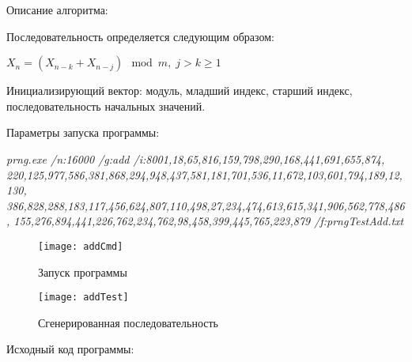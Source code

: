 \documentclass[bachelor, och, coursework]{shiza}
\begin{document}
	Описание алгоритма:
	
	Последовательность определяется следующим образом:
	\begin{center}
		$X_n = (X_{n - k} + X_{n - j}) \mod m, \; j > k \geq 1$
	\end{center}

	Инициализирующий вектор: модуль, младший индекс, старший индекс, последовательность начальных значений.
	
	Параметры запуска программы:
	
	\textit{prng.exe /n:16000 /g:add /i:8001,18,65,816,159,798,290,168,441,691,655,874, 220,125,977,586,381,868,294,948,437,581,181,701,536,11,672,103,601,794,189,12,130, 386,828,288,183,117,456,624,807,110,498,27,234,474,613,615,341,906,562,778,486, 155,276,894,441,226,762,234,762,98,458,399,445,765,223,879 /f:prngTestAdd.txt}
	
	\begin{figure}[H]
		\centering
		\texttt{[image: addCmd]}
		\caption{Запуск программы}
		\label{fig:addCmd}
	\end{figure}
	
	\begin{figure}[H]
		\centering
		\texttt{[image: addTest]}
		\caption{Сгенерированная последовательность}
		\label{fig:addTest}
	\end{figure}

	Исходный код программы:
	
\end{document}
